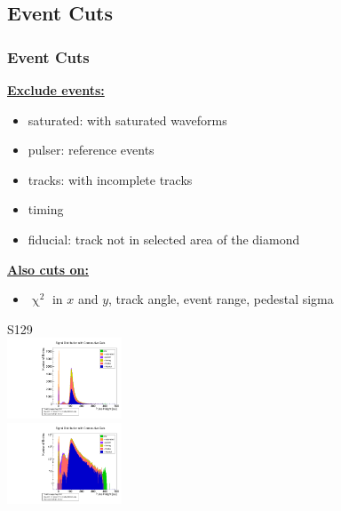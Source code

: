 \documentclass[9pt]{beamer}
\begin{document}
\subsection{Event Cuts}
\begin{frame}
	\frametitle{Event Cuts}
	\begin{minipage}[c][.8\textheight]{7cm}
		\underline{\textbf{Exclude events:}}\s
		\begin{itemize}
			\small
			\setlength{\itemsep}{\fill}
			\item saturated: with saturated waveforms
			\item pulser: reference events 
			\item tracks: with incomplete tracks
			\item timing
			\item fiducial: track not in selected area of the diamond
		\end{itemize}
		\vspace*{1cm}
		\underline{\textbf{Also cuts on:}}\s
		\begin{itemize}
			\item $\upchi^{2}$ in $x$ and $y$, track angle, event range, pedestal sigma
		\end{itemize}
	\end{minipage}
	\hspace*{2pt}
	\begin{minipage}{4cm}
		\centering
		S129\\
		\vspace*{-5pt}
		\includegraphics[angle=270, width=3.4cm]{Consecutive807}\\
		\includegraphics[angle=270, width=3.4cm]{ConsecutiveLog807}
	\end{minipage}
\end{frame}
\end{document}
